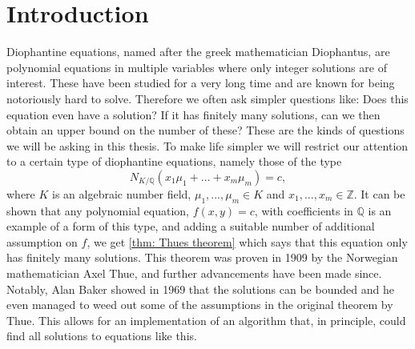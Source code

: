 \documentclass{article}
\newcommand{\mbb}[1]{\mathbb{#1}}
\begin{document}

\tableofcontents



\section{Introduction}

Diophantine equations, named after the greek mathematician Diophantus, are polynomial equations in multiple variables where only integer solutions are of interest. These have been studied for a very long time and are known for being notoriously hard to solve. Therefore we often ask simpler questions like: Does this equation even have a solution? If it has finitely many solutions, can we then obtain an upper bound on the number of these? These are the kinds of questions we will be asking in this thesis. To make life simpler we will restrict our attention to a certain type of diophantine equations, namely those of the type
$$N_{K / \mbb Q}(x_1 \mu_1 + ... + x_m \mu_m) = c,$$
where $K$ is an algebraic number field, $\mu_1, ..., \mu_m \in K$ and $x_1, ..., x_m \in \mbb Z$. It can be shown that any polynomial equation, $f(x,y) = c$, with coefficients in $\mbb Q$ is an example of a form of this type, and adding a suitable number of additional assumption on $f$, we get \cref{thm: Thues theorem} which says that this equation only has finitely many solutions. This theorem was proven in 1909 by the Norwegian mathematician Axel Thue, and further advancements have been made since. Notably, Alan Baker showed in 1969 that the solutions can be bounded and he even managed to weed out some of the assumptions in the original theorem by Thue. This allows for an implementation of an algorithm that, in principle, could find all solutions to equations like this.  

 


\end{document}
